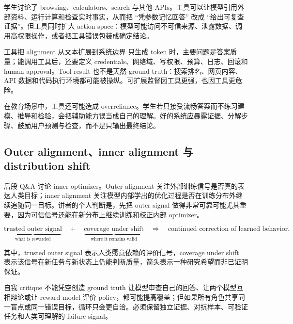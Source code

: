 学生讨论了 browsing、calculators、search 与其他 APIs。工具可以让模型引用外部资料、运行计算和检查实时事实，从而把 ``凭参数记忆回答'' 改成 ``给出可复查证据''。但工具同时扩大 action space：模型可能访问不可信来源、泄露数据、调用高权限操作，或者把工具错误包装成确定结论。

\begin{knowledgebox}{工具把 alignment 从文本扩展到系统边界}
只生成 token 时，主要问题是答案质量；能调用工具后，还要定义 credentials、网络域、写权限、预算、日志、回滚和 human approval。Tool result 也不是天然 ground truth：搜索排名、网页内容、API 数据和代码执行环境都可能被操纵。可扩展监督因工具更强，也因工具更危险。
\end{knowledgebox}

在教育场景中，工具还可能造成 overreliance。学生若只接受流畅答案而不练习建模、推导和检验，会把辅助能力误当成自己的理解。好的系统应暴露证据、分解步骤、鼓励用户预测与检查，而不是只输出最终结论。

\subsection{Outer alignment、inner alignment 与 distribution shift}

后段 Q\&A 讨论 inner optimizer。Outer alignment 关注外部训练信号是否真的表达人类目标；inner alignment 关注模型内部学出的优化过程是否在训练分布外继续追随同一目标。讲者的个人判断是，先把 outer signal 做得非常可靠可能尤其重要，因为可信信号还能在新分布上继续训练和校正内部 optimizer。

\[
\underbrace{\text{trusted outer signal}}_{\text{what is rewarded}}
\quad+\quad
\underbrace{\text{coverage under shift}}_{\text{where it remains valid}}
\quad\Longrightarrow\quad
\text{continued correction of learned behavior}.
\]

其中，trusted outer signal 表示人类愿意依赖的评价信号，coverage under shift 表示该信号在新任务与新状态上仍能判断质量，箭头表示一种研究希望而非已证明保证。


\begin{warningbox}{自我 critique 不能凭空创造 ground truth}
让模型审查自己的回答、让两个模型互相辩论或让 reward model 评价 policy，都可能提高覆盖；但如果所有角色共享同一盲点或同一错误目标，循环只会更自洽。必须保留独立证据、对抗样本、可验证任务和人类可理解的 failure signal。
\end{warningbox}

